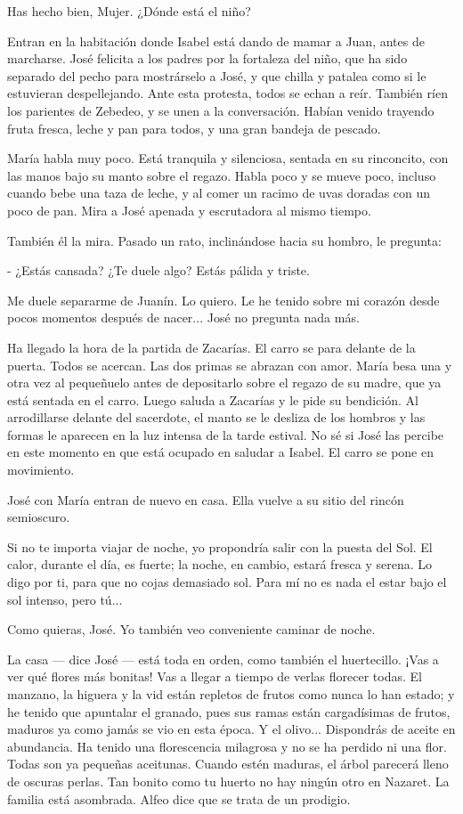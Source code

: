 \documentclass[12pt]{book} %
\begin{document}
Has hecho bien, Mujer. ¿Dónde está el niño? 

Entran en la habitación donde Isabel está dando de mamar a Juan, antes de marcharse. José felicita a los padres por la fortaleza del niño, que ha sido separado del pecho para mostrárselo a José, y que chilla y patalea como si le estuvieran despellejando. Ante esta protesta, todos se echan a reír. También ríen los parientes de Zebedeo, y se unen a la conversación. Habían venido trayendo fruta fresca, leche y pan para todos, y una gran bandeja de pescado. 

María habla muy poco. Está tranquila y silenciosa, sentada en su rinconcito, con las manos bajo su manto sobre el regazo. Habla poco y se mueve poco, incluso cuando bebe una taza de leche, y al comer un racimo de uvas doradas con un poco de pan. Mira a José apenada y escrutadora al mismo tiempo. 

También él la mira. Pasado un rato, inclinándose hacia su hombro, le pregunta: 

- ¿Estás cansada? ¿Te duele algo? Estás pálida y triste. 

Me duele separarme de Juanín. Lo quiero. Le he tenido sobre mi corazón desde pocos momentos después de nacer... José no pregunta nada más. 

Ha llegado la hora de la partida de Zacarías. El carro se para delante de la puerta. Todos se acercan. Las dos primas se abrazan con amor. María besa una y otra vez al pequeñuelo antes de depositarlo sobre el regazo de su madre, que ya está sentada en el carro. Luego saluda a Zacarías y le pide su bendición. Al arrodillarse delante del sacerdote, el manto se le desliza de los hombros y las formas le aparecen en la luz intensa de la tarde estival. No sé si José las percibe en este momento en que está ocupado en saludar a Isabel. El carro se pone en movimiento. 

José con María entran de nuevo en casa. Ella vuelve a su sitio del rincón semioscuro. 

Si no te importa viajar de noche, yo propondría salir con la puesta del Sol. El calor, durante el día, es fuerte; la noche, en cambio, estará fresca y serena. Lo digo por ti, para que no cojas demasiado sol. Para mí no es nada el estar bajo el sol intenso, pero tú... 

Como quieras, José. Yo también veo conveniente caminar de noche. 

La casa — dice José — está toda en orden, como también el huertecillo. ¡Vas a ver qué flores más bonitas! Vas a llegar a tiempo de verlas florecer todas. El manzano, la higuera y la vid están repletos de frutos como nunca lo han estado; y he tenido que apuntalar el granado, pues sus ramas están cargadísimas de frutos, maduros ya como jamás se vio en esta época. Y el olivo... Dispondrás de aceite en abundancia. Ha tenido una florescencia milagrosa y no se ha perdido ni una flor. Todas son ya pequeñas aceitunas. Cuando estén maduras, el árbol parecerá lleno de oscuras perlas. Tan bonito como tu huerto no hay ningún otro en Nazaret. La familia está asombrada. Alfeo dice que se trata de un prodigio. 
\end{document}
